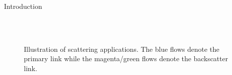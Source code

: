 \begin{section}{Introduction}
	\begin{figure}[H]
		\centering
		\\
		\subfloat[\gls{sr}]{
			\resizebox{0.48\linewidth}{!}{
				
			}
			\label{fg:sr}
		}
		\\
		\subfloat[RIScatter]{
			\resizebox{0.48\linewidth}{!}{
				
			}
			\label{fg:riscatter}
		}
		\caption{
			Illustration of scattering applications.
			The blue flows denote the primary link while the magenta/green flows denote the backscatter link.
		}
		\label{fg:scatter_illustration}
	\end{figure}


\end{section}
